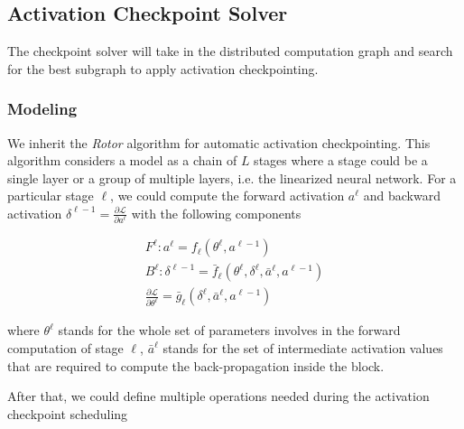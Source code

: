 \subsection{Activation Checkpoint Solver}

The checkpoint solver will take in the distributed computation graph and search for the best subgraph to apply activation checkpointing.

\subsubsection{Modeling}\label{modeling}

We inherit the \textit{Rotor} algorithm\cite{herrmann2019optimal} for automatic activation checkpointing. This algorithm considers a model as a chain of $L$ stages where a stage could be a single layer or a group of multiple layers, i.e. the linearized neural network. For a particular stage $\ell$, we could compute the forward activation $a^{\ell}$ and backward activation $\delta^{\ell-1} = \frac{\partial \mathcal{L}}{\partial a^{\ell}}$ with the following components

\begin{equation}
\begin{gathered}
F^{\ell}: a^{\ell}=f_{\ell}\left(\theta^{\ell}, a^{\ell-1}\right) \\
B^{\ell}: \delta^{\ell-1}=\bar{f}_{\ell}\left(\theta^{\ell}, \delta^{\ell}, \bar{a}^{\ell}, a^{\ell-1}\right) \\
\frac{\partial \mathcal{L}}{\partial \theta^{\ell}}=\bar{g}_{\ell}\left(\delta^{\ell}, \bar{a}^{\ell}, a^{\ell-1}\right)
\end{gathered}
\end{equation}

where $\theta^{\ell}$ stands for the whole set of parameters involves in the forward computation of stage $\ell$, $\bar{a}^{\ell}$ stands for the set of intermediate activation values that are required to compute the back-propagation inside the block.

After that, we could define multiple operations needed during the activation checkpoint scheduling

